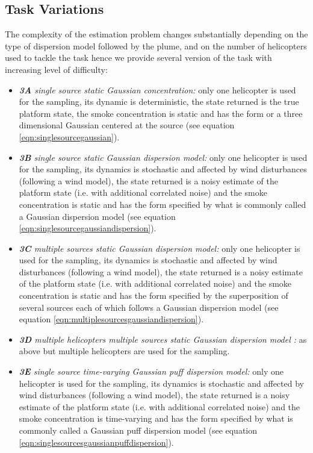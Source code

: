 \documentclass{article}
\begin{document}
\subsection{Task Variations}  \label{PlumeVariations}
The complexity of the estimation problem changes substantially depending on the type of dispersion model followed by the plume, and on the number of helicopters used to tackle the task hence we provide several version of the task with increasing level of difficulty:
\begin{itemize}
\item \textit{\textbf{3A} single source static Gaussian concentration:} only one helicopter is used for the sampling, its dynamic is deterministic, the state returned is the true platform state, the smoke concentration is static and has the form or a three dimensional Gaussian centered at the source (see equation \ref{eqn:singlesourcegaussian}).

\item \textit{\textbf{3B} single source static Gaussian dispersion model:} only one helicopter is used for the sampling, its dynamics is stochastic and affected by wind disturbances (following a wind model), the state returned is a noisy estimate of the platform state (i.e. with additional correlated noise) and the smoke concentration is static and has the form specified by what is commonly called a Gaussian dispersion model (see equation \ref{eqn:singlesourcegaussiandispersion}).

\item \textit{\textbf{3C} multiple sources static Gaussian dispersion model:} only one helicopter is used for the sampling, its dynamics is stochastic and affected by wind disturbances (following a wind model), the state returned is a noisy estimate of the platform state (i.e. with additional correlated noise) and the smoke concentration is static and has the form specified by the superposition of several sources each of which follows a Gaussian dispersion model (see equation \ref{eqn:multiplesourcesgaussiandispersion}).

\item \textit{\textbf{3D} multiple helicopters multiple sources static Gaussian dispersion model :} as above but multiple helicopters are used for the sampling.

\item \textit{\textbf{3E} single source time-varying Gaussian puff dispersion model:} only one helicopter is used for the sampling, its dynamics is stochastic and affected by wind disturbances (following a wind model), the state returned is a noisy estimate of the platform state (i.e. with additional correlated noise) and the smoke concentration is time-varying and has the form specified by what is commonly called a Gaussian puff dispersion model (see equation \ref{eqn:singlesourcesgaussianpuffdispersion}).


\end{itemize}
\end{document}

